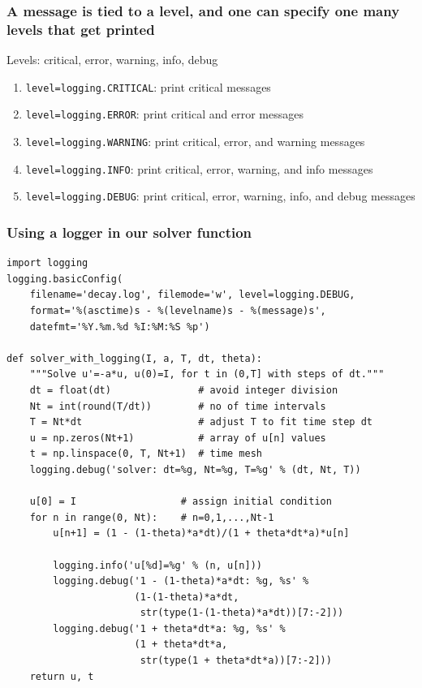 \documentclass{beamer}
\begin{document}
\begin{frame}
\frametitle{A message is tied to a level, and one can specify one many levels that get printed}

Levels: critical, error, warning, info, debug

\begin{enumerate}
\item \texttt{level=logging.CRITICAL}: print critical messages

\item \texttt{level=logging.ERROR}: print critical and error messages

\item \texttt{level=logging.WARNING}: print critical, error, and warning messages

\item \texttt{level=logging.INFO}: print critical, error, warning, and info messages

\item \texttt{level=logging.DEBUG}: print critical, error, warning, info, and debug messages
\end{enumerate}

\noindent
\end{frame}

\begin{frame}
\frametitle{Using a logger in our solver function}

\begin{verbatim}
import logging
logging.basicConfig(
    filename='decay.log', filemode='w', level=logging.DEBUG,
    format='%(asctime)s - %(levelname)s - %(message)s',
    datefmt='%Y.%m.%d %I:%M:%S %p')

def solver_with_logging(I, a, T, dt, theta):
    """Solve u'=-a*u, u(0)=I, for t in (0,T] with steps of dt."""
    dt = float(dt)               # avoid integer division
    Nt = int(round(T/dt))        # no of time intervals
    T = Nt*dt                    # adjust T to fit time step dt
    u = np.zeros(Nt+1)           # array of u[n] values
    t = np.linspace(0, T, Nt+1)  # time mesh
    logging.debug('solver: dt=%g, Nt=%g, T=%g' % (dt, Nt, T))

    u[0] = I                  # assign initial condition
    for n in range(0, Nt):    # n=0,1,...,Nt-1
        u[n+1] = (1 - (1-theta)*a*dt)/(1 + theta*dt*a)*u[n]

        logging.info('u[%d]=%g' % (n, u[n]))
        logging.debug('1 - (1-theta)*a*dt: %g, %s' %
                      (1-(1-theta)*a*dt,
                       str(type(1-(1-theta)*a*dt))[7:-2]))
        logging.debug('1 + theta*dt*a: %g, %s' %
                      (1 + theta*dt*a,
                       str(type(1 + theta*dt*a))[7:-2]))
    return u, t
\end{verbatim}
\end{frame}
\end{document}
